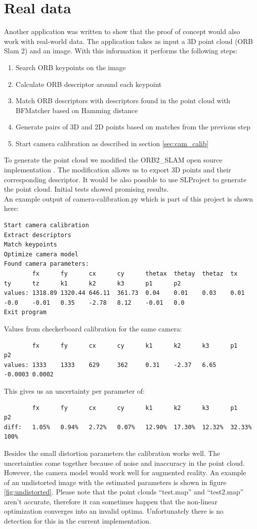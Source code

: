 \documentclass[11pt,a4paper,titlepage,oneside]{report}
\begin{document}
\section{Real data}
Another application was written to show that the proof of concept would also work with real-world data. The application takes as input a 3D point cloud (ORB Slam 2) and an image. With this information it performs the following steps:
\begin{enumerate}
	\item Search ORB keypoints on the image
	\item Calculate ORB descriptor around each keypoint
	\item Match ORB descriptors with descriptors found in the point cloud with BFMatcher \cite{BFMatcher} based on Hamming distance
	\item Generate pairs of 3D and 2D points based on matches from the previous step
	\item Start camera calibration as described in section \ref{sec:cam_calib}
\end{enumerate}
To generate the point cloud we modified the ORB2\_SLAM open source implementation \cite{orbslam2_impl}. The modification allows us to export 3D points and their corresponding descriptor. It would be also possible to use SLProject to generate the point cloud. Initial tests showed promising results.\\
An example output of camera-calibration.py which is part of this project is shown here:
\tiny
\begin{lstlisting}
Start camera calibration
Extract descriptors
Match keypoints
Optimize camera model
Found camera parameters:
        fx      fy      cx      cy      thetax  thetay  thetaz  tx      ty      tz      k1      k2      k3      p1      p2
values: 1318.89 1320.44 646.11  361.73  0.04    0.01    0.03    0.01    -0.0    -0.01   0.35    -2.78   8.12    -0.01   0.0
Exit program
\end{lstlisting}
Values from checkerboard calibration for the same camera:
\begin{lstlisting}
        fx      fy      cx      cy      k1      k2      k3      p1      p2
values: 1333    1333    629     362     0.31    -2.37   6.65    -0.0003 0.0002
\end{lstlisting}
This gives us an uncertainty per parameter of:
\begin{lstlisting}
        fx      fy      cx      cy      k1      k2      k3      p1      p2
diff:   1.05%   0.94%   2.72%   0.07%   12.90%  17.30%  12.32%  32.33% 100%
\end{lstlisting}
\normalsize
Besides the small distortion parameters the calibration works well. The uncertainties come together because of noise and inaccuracy in the point cloud. However, the camera model would work well for augmented reality. An example of an undistorted image with the estimated parameters is shown in figure \ref{fig:undistorted}. Please note that the point clouds ``test.map'' and ``test2.map'' aren't accurate, therefore it can sometimes happen that the non-linear optimization converges into an invalid optima. Unfortunately there is no detection for this in the current implementation.
\end{document}
